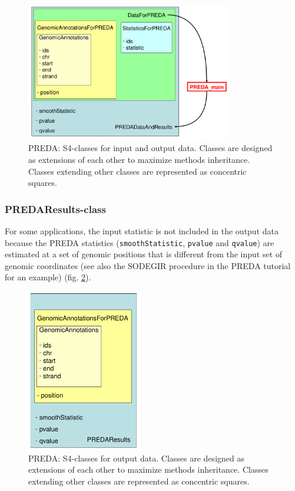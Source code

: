 \documentclass[a4paper,10pt]{article}
\begin{document}
\begin{figure}[htbp]
 \centering
 \includegraphics[width=9cm]{images/PREDA_inputoutputClasses.png}
  \caption{PREDA: S4-classes for input and output data. Classes are designed as extensions of each other to maximize methods inheritance. Classes extending other classes are represented as concentric squares.}
 \label{fig:PREDA_inputoutputClasses}
\end{figure}


\subsubsection{PREDAResults-class}

For some applications, the input statistic is not included in the output data because the PREDA statistics (\texttt{smoothStatistic}, \texttt{pvalue} and \texttt{qvalue}) are estimated at a set of genomic positions that is different from the input set of genomic coordinates (see also the SODEGIR procedure in the PREDA tutorial for an example) (fig. \ref{fig:PREDA_outputClasses}).

\begin{figure}[htbp]
 \centering
 \includegraphics[width=5cm]{images/PREDA_outputClasses.png}
  \caption{PREDA: S4-classes for output data. Classes are designed as extensions of each other to maximize methods inheritance. Classes extending other classes are represented as concentric squares.}
 \label{fig:PREDA_outputClasses}
\end{figure}
\end{document}
